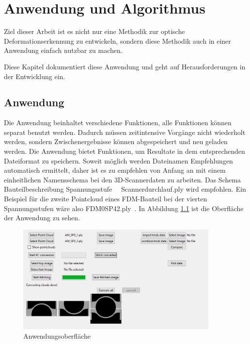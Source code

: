 
\chapter{Anwendung und Algorithmus}

Ziel dieser Arbeit ist es nicht nur eine Methodik zur optische 
Deformationserkennung zu entwickeln, sondern diese Methodik auch in einer 
Anwendung einfach nutzbar zu machen. 

Diese Kapitel dokumentiert diese Anwendung und geht auf Herausforderungen 
in der Entwicklung ein.

\section{Anwendung}

Die Anwendung beinhaltet verschiedene Funktionen, alle Funktionen 
können separat benutzt werden. Dadurch müssen zeitintensive Vorgänge nicht 
wiederholt werden, sondern Zwischenergebnisse können abgespeichert und 
neu geladen werden.
Die Anwendung bietet Funktionen, um Resultate in dem entsprechenden Dateiformat zu 
speichern. Soweit möglich werden Dateinamen Empfehlungen automatisch ermittelt, 
daher ist es zu empfehlen von Anfang an mit einem einheitlichen Namensschema bei
den 3D-Scannerdaten zu arbeiten. 
Das Schema \glqq Bauteilbeschreibung \textunderscore Spannungsstufe\grqq~~
\textunderscore Scannerdurchlauf.ply
wird empfohlen. Ein Beispiel für die zweite Pointcloud eines FDM-Bauteil bei der
vierten Spannungsstufen wäre also \glqq FDM0\textunderscore SP4\textunderscore 2.ply\grqq~.
In Abbildung \ref{fig:software_screenshot} ist die Oberfläche der Anwendung zu sehen.

\begin{figure}[H]
    \centering
    \includegraphics[width=0.9\textwidth]{images/software_screenshot2.png}
    \caption{Anwendungsoberfläche}
    \label{fig:software_screenshot}
\end{figure}

